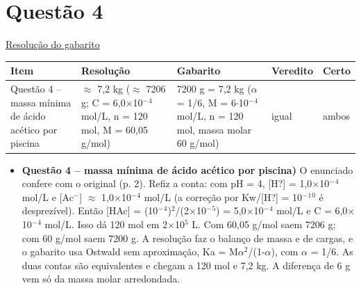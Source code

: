\documentclass{article}%
\begin{document}
\section*{Questão 4}%
\href{https://poliedroresolve.sistemapoliedro.com.br/vestibulares/ime/2026/ime-2-fase-dia-3-25-10-2025-2-fase-dia-3/dissertativa-4-quimica-2-fase-dia-3-ime-2026}{Resolução do gabarito}\par\smallskip%
\begin{longtable}{@{}p{} p{} p{} p{} p{}@{}}\toprule Item & Resolução & Gabarito & Veredito & Certo \\ \midrule
Questão 4 -- massa mínima de ácido acético por piscina & $\approx$ 7,2 kg ($\approx$ 7206 g; C = 6,0$\times$10$^{-}$$^{4}$ mol/L, n = 120 mol, M = 60,05 g/mol) & 7200 g = 7,2 kg ($\alpha$ = 1/6, M = 6$\cdot$10$^{-}$$^{4}$ mol/L, n = 120 mol, massa molar 60 g/mol) & igual & ambos \\
\bottomrule\end{longtable}%
\begin{itemize}%
\item%
\textbf{Questão 4 -- massa mínima de ácido acético por piscina)} O enunciado confere com o original (p. 2). Refiz a conta: com pH = 4, {[}H?{]} = 1,0$\times$10$^{-}$$^{4}$ mol/L e {[}Ac$^{-}${]} $\approx$ 1,0$\times$10$^{-}$$^{4}$ mol/L (a correção por Kw/{[}H?{]} = 10$^{-}$$^{1}$$^{0}$ é desprezível). Então {[}HAc{]} = (10$^{-}$$^{4}$)$^2$/(2$\times$10$^{-}$$^{5}$) = 5,0$\times$10$^{-}$$^{4}$ mol/L e C = 6,0$\times$10$^{-}$$^{4}$ mol/L. Isso dá 120 mol em 2$\times$10$^{5}$ L. Com 60,05 g/mol saem 7206 g; com 60 g/mol saem 7200 g. A resolução faz o balanço de massa e de cargas, e o gabarito usa Ostwald sem aproximação, Ka = M$\alpha$$^2$/(1-$\alpha$), com $\alpha$ = 1/6. As duas contas são equivalentes e chegam a 120 mol e 7,2 kg. A diferença de 6 g vem só da massa molar arredondada.%
\end{itemize}%
\end{document}

